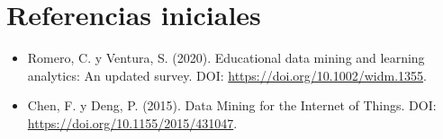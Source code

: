 \documentclass[12pt,a4paper]{article}
\begin{document}
\section{Referencias iniciales}
\begin{itemize}
\item Romero, C. y Ventura, S. (2020). Educational data mining and learning analytics: An updated survey. DOI: \url{https://doi.org/10.1002/widm.1355}.
\item Chen, F. y Deng, P. (2015). Data Mining for the Internet of Things. DOI: \url{https://doi.org/10.1155/2015/431047}.
\end{itemize}
\end{document}

